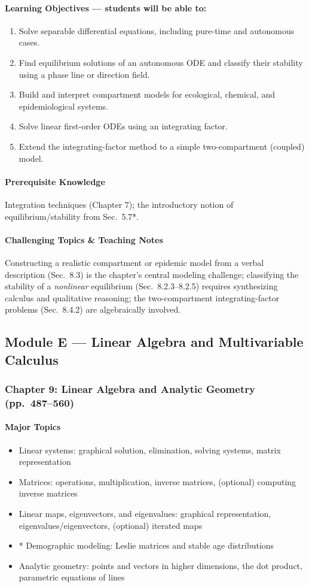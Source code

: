 \documentclass[11pt]{article}
\newcommand{\ChapHead}[2]{\subsubsection{#1 \textnormal{\normalfont\normalsize\color{lightgray}(pp.\ #2)}}}
\newcommand{\MajorTopics}{\paragraph{Major Topics}}
\newcommand{\LearnObj}{\paragraph{Learning Objectives --- students will be able to:}}
\newcommand{\PreReq}{\paragraph{Prerequisite Knowledge}}
\newcommand{\Hard}{\paragraph{Challenging Topics \& Teaching Notes}}
\begin{document}
\LearnObj
\begin{enumerate}
\item Solve separable differential equations, including pure-time and autonomous cases.
\item Find equilibrium solutions of an autonomous ODE and classify their stability using a phase line or direction field.
\item Build and interpret compartment models for ecological, chemical, and epidemiological systems.
\item Solve linear first-order ODEs using an integrating factor.
\item Extend the integrating-factor method to a simple two-compartment (coupled) model.
\end{enumerate}

\PreReq Integration techniques (Chapter 7); the introductory notion of equilibrium/stability from Sec.\ 5.7*.

\Hard Constructing a realistic compartment or epidemic model from a verbal
description (Sec.\ 8.3) is the chapter's central modeling challenge;
classifying the stability of a \emph{nonlinear} equilibrium (Sec.\
8.2.3--8.2.5) requires synthesizing calculus and qualitative reasoning; the
two-compartment integrating-factor problems (Sec.\ 8.4.2) are algebraically
involved.

\subsection{Module E --- Linear Algebra and Multivariable Calculus}

\ChapHead{Chapter 9: Linear Algebra and Analytic Geometry}{487--560}

\MajorTopics
\begin{itemize}
\item Linear systems: graphical solution, elimination, solving systems, matrix representation
\item Matrices: operations, multiplication, inverse matrices, (optional) computing inverse matrices
\item Linear maps, eigenvectors, and eigenvalues: graphical representation, eigenvalues/eigenvectors, (optional) iterated maps
\item * Demographic modeling: Leslie matrices and stable age distributions
\item Analytic geometry: points and vectors in higher dimensions, the dot product, parametric equations of lines
\end{itemize}
\end{document}
